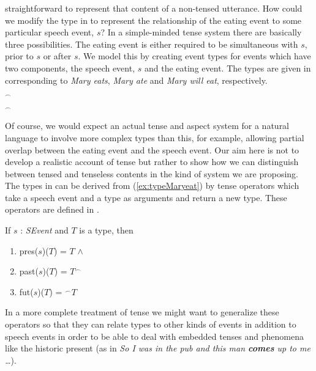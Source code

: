 straightforward to represent that content of a non-tensed utterance.
How could we modify the type in \preveg{} to represent the
relationship of the eating event to some particular speech event, $s$?
In a simple-minded tense system there are basically three
possibilities. The eating event is either required to be simultaneous
with $s$, prior to $s$ or after $s$.  We model this by creating event
types for events which have two components, the speech event, $s$ and
the eating event.  The types are given in  corresponding
to \textit{Mary eats}, \textit{Mary ate} and \textit{Mary will eat}, respectively.
\begin{ex} 
\begin{subex} 
 
\item {} 
 
\item
  $^{\frown}$

\item {}$^{\frown}$
 
\end{subex} 
   
\end{ex} 
Of course, we would expect an actual tense and aspect system for a
natural language to involve more complex types than this, for example,
allowing partial overlap between the eating event and the speech
event.  Our aim here is not to develop a realistic account of tense
but rather to show how we can distinguish between tensed and tenseless
contents in the kind of system we are proposing. The types in
\preveg{} can be derived from (\ref{ex:typeMaryeat}) by tense
operators which take  a speech event and a type as arguments and return
a new type.  These operators are defined in \nexteg{}.
\begin{ex} 
If $s$ : \textit{SEvent} and $T$ is a type, then
\begin{enumerate} 
 
\item pres($s$)($T$) = $T$ \d{$\wedge$}  
 
\item past($s$)($T$) =
  $T^{\frown}$

\item fut($s$)($T$) = $^{\frown}T$ 
 
\end{enumerate} 
   
\end{ex} 
In a more complete treatment of tense we might want to generalize
these operators so that they can relate types to other kinds of events
in addition to speech events in order to be able to deal with embedded
tenses and phenomena like the historic present (as in \textit{So I was
  in the pub and this man \textbf{comes} up to me \ldots}).  

